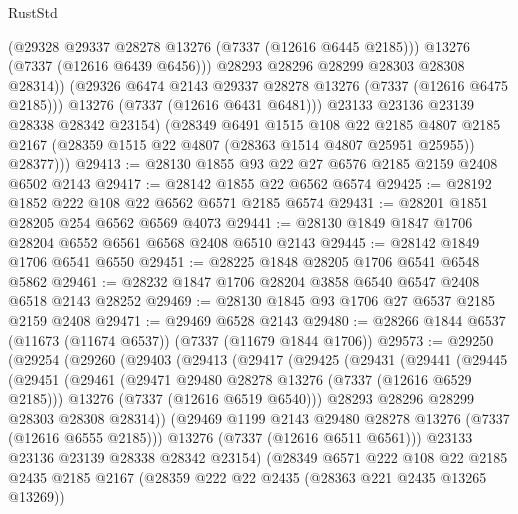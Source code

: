 \begin{lexlean}{RustStd}
\begin{coremodule}
                  (@29328 @29337 @28278 @13276 (@7337 (@12616 @6445 @2185)))
                  @13276
                  (@7337 (@12616 @6439 @6456)))
                @28293
                @28296
                @28299
                @28303
                @28308
                @28314))
            (@29326 @6474 @2143 @29337 @28278 @13276 (@7337 (@12616 @6475 @2185)))
            @13276
            (@7337 (@12616 @6431 @6481)))
          @23133
          @23136
          @23139
          @28338
          @28342
          @23154)
        (@28349
          @6491
          @1515
          @108
          @22
          @2185
          @4807
          @2185
          @2167
          (@28359 @1515 @22 @4807 (@28363 @1514 @4807 @25951 @25955))
          @28377)))
@29413 := @28130 @1855 @93 @22 @27 @6576 @2185 @2159 @2408 @6502 @2143
@29417 := @28142 @1855 @22 @6562 @6574
@29425 := @28192 @1852 @222 @108 @22 @6562 @6571 @2185 @6574
@29431 := @28201 @1851 @28205 @254 @6562 @6569 @4073
@29441 := @28130 @1849 @1847 @1706 @28204 @6552 @6561 @6568 @2408 @6510 @2143
@29445 := @28142 @1849 @1706 @6541 @6550
@29451 := @28225 @1848 @28205 @1706 @6541 @6548 @5862
@29461 := @28232 @1847 @1706 @28204 @3858 @6540 @6547 @2408 @6518 @2143 @28252
@29469 := @28130 @1845 @93 @1706 @27 @6537 @2185 @2159 @2408
@29471 := @29469 @6528 @2143
@29480 := @28266 @1844 @6537 (@11673 (@11674 @6537)) (@7337 (@11679 @1844 @1706))
@29573 := @29250
    (@29254
      (@29260
        (@29403
          (@29413
            (@29417
              (@29425
                (@29431
                  (@29441
                    (@29445
                      (@29451
                        (@29461
                          (@29471 @29480 @28278 @13276 (@7337 (@12616 @6529 @2185)))
                          @13276
                          (@7337 (@12616 @6519 @6540)))
                        @28293
                        @28296
                        @28299
                        @28303
                        @28308
                        @28314))
                    (@29469 @1199 @2143 @29480 @28278 @13276 (@7337 (@12616 @6555 @2185)))
                    @13276
                    (@7337 (@12616 @6511 @6561)))
                  @23133
                  @23136
                  @23139
                  @28338
                  @28342
                  @23154)
                (@28349
                  @6571
                  @222
                  @108
                  @22
                  @2185
                  @2435
                  @2185
                  @2167
                  (@28359 @222 @22 @2435 (@28363 @221 @2435 @13265 @13269))

\end{coremodule}
\end{lexlean}
